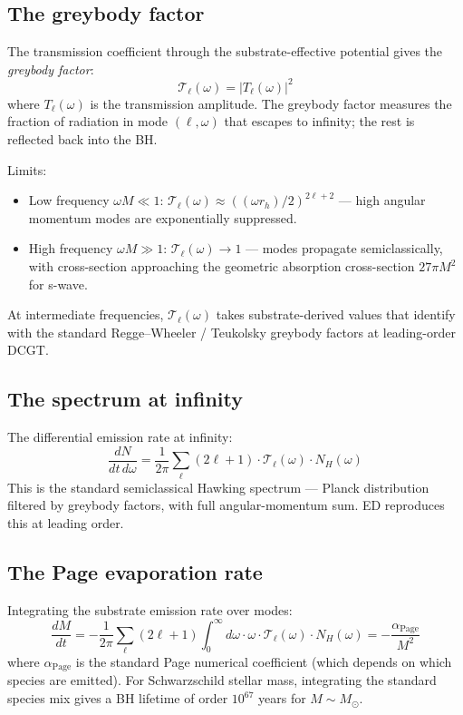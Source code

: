 \documentclass[11pt,a4paper]{article}
\begin{document}
\subsection{The greybody factor}

The transmission coefficient through the substrate-effective potential gives the \emph{greybody factor}:
\[
\mathcal{T}_\ell(\omega) = |T_\ell(\omega)|^{2}
\]
where $T_\ell(\omega)$ is the transmission amplitude. The greybody factor measures the fraction of radiation in mode $(\ell, \omega)$ that escapes to infinity; the rest is reflected back into the BH.

Limits:
\begin{itemize}[noitemsep]
  \item Low frequency $\omega M \ll 1$: $\mathcal{T}_\ell(\omega) \approx ((\omega r_h)/2)^{2\ell+2}$ --- high angular momentum modes are exponentially suppressed.
  \item High frequency $\omega M \gg 1$: $\mathcal{T}_\ell(\omega) \to 1$ --- modes propagate semiclassically, with cross-section approaching the geometric absorption cross-section $27\pi M^2$ for s-wave.
\end{itemize}

At intermediate frequencies, $\mathcal{T}_\ell(\omega)$ takes substrate-derived values that identify with the standard Regge--Wheeler / Teukolsky greybody factors at leading-order DCGT.

\subsection{The spectrum at infinity}

The differential emission rate at infinity:
\[
\frac{dN}{dt\, d\omega} = \frac{1}{2\pi} \sum_\ell (2\ell+1) \cdot \mathcal{T}_\ell(\omega) \cdot N_H(\omega)
\]
This is the standard semiclassical Hawking spectrum --- Planck distribution filtered by greybody factors, with full angular-momentum sum. ED reproduces this at leading order.

\subsection{The Page evaporation rate}

Integrating the substrate emission rate over modes:
\[
\frac{dM}{dt} = -\frac{1}{2\pi} \sum_\ell (2\ell+1) \int_0^\infty d\omega \cdot \omega \cdot \mathcal{T}_\ell(\omega) \cdot N_H(\omega) = -\frac{\alpha_{\mathrm{Page}}}{M^{2}}
\]
where $\alpha_{\mathrm{Page}}$ is the standard Page numerical coefficient (which depends on which species are emitted). For Schwarzschild stellar mass, integrating the standard species mix gives a BH lifetime of order $10^{67}$ years for $M \sim M_\odot$.
\end{document}
